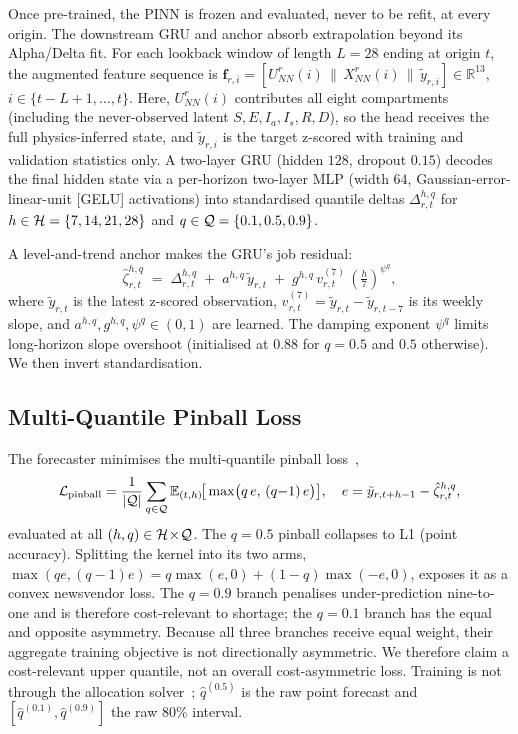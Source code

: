 Once pre-trained, the PINN is frozen and evaluated, never to be refit, at every
origin. The downstream GRU and anchor absorb extrapolation beyond its
Alpha/Delta fit. For each lookback window of length
$L=28$ ending at origin $t$, the augmented feature sequence is
$\mathbf{f}_{r,i} = [U^r_{NN}(i)\,\|\,X^r_{NN}(i)\,\|\,
\tilde y_{r,i}] \in \mathbb{R}^{13}$, $i \in \{t-L+1,\dots,t\}$.
Here, $U^r_{NN}(i)$ contributes all eight compartments (including the
never-observed latent $S,E,I_a,I_s,R,D$), so the head receives the full
physics-inferred state, and $\tilde y_{r,i}$ is the target z-scored with
training and validation statistics only.
A two-layer
GRU (hidden $128$, dropout $0.15$) decodes the final hidden state via a
per-horizon two-layer MLP (width $64$, Gaussian-error-linear-unit
[GELU] activations) into standardised quantile
deltas $\Delta_{r,t}^{h,q}$ for $h\in\mathcal{H}=\{7,14,21,28\}$ and
$q\in\mathcal{Q}=\{0.1,0.5,0.9\}$.

A level-and-trend anchor makes the GRU's job residual:
\begin{equation}\label{eq:anchor}
\hat\zeta_{r,t}^{h,q} \;=\; \Delta_{r,t}^{h,q}
  \;+\; a^{h,q}\, \tilde y_{r,t}
  \;+\; g^{h,q}\, v_{r,t}^{(7)}\,
        \!\left(\tfrac{h}{7}\right)^{\!\!\psi^q},
\end{equation}
where $\tilde y_{r,t}$ is the latest z-scored observation,
$v_{r,t}^{(7)}=\tilde y_{r,t}-\tilde y_{r,t-7}$ is its weekly slope,
and $a^{h,q},g^{h,q},\psi^q\in(0,1)$ are learned. The damping exponent
$\psi^q$ limits long-horizon slope overshoot (initialised at $0.88$ for
$q{=}0.5$ and $0.5$ otherwise). We then invert standardisation.

\subsection{Multi-Quantile Pinball Loss}\label{ssec:loss}

The forecaster minimises the multi-quantile pinball
loss~\cite{koenker1978regression},
\begin{equation}\label{eq:pinball}
\mathcal{L}_{\text{pinball}} = \frac{1}{|\mathcal{Q}|}\sum_{q\in\mathcal{Q}}
  \mathbb{E}_{(t,h)}\!\big[\max\!\big(
    q\, e,\, (q{-}1)\, e\big)\big],\quad
    e = \tilde y_{r,t+h-1} - \hat\zeta_{r,t}^{h,q},
\end{equation}
evaluated at all $(h,q)\in\mathcal{H}\!\times\!\mathcal{Q}$. The $q=0.5$ pinball
collapses to L1 (point accuracy). Splitting the kernel into its two arms,
$\max(q e,(q{-}1)e)=q\max(e,0)+(1{-}q)\max(-e,0)$, exposes it as a
convex newsvendor loss. The $q{=}0.9$ branch penalises
under-prediction nine-to-one and is therefore cost-relevant to shortage;
the $q{=}0.1$ branch has the equal and opposite asymmetry. Because all
three branches receive equal weight, their aggregate training objective
is not directionally asymmetric. We therefore claim a cost-relevant
upper quantile, not an overall cost-asymmetric loss. Training is not
through the allocation solver~\cite{elmachtoub2022smart};
$\hat q^{(0.5)}$ is the raw point forecast and
$[\hat q^{(0.1)},\hat q^{(0.9)}]$ the raw $80\%$ interval.

